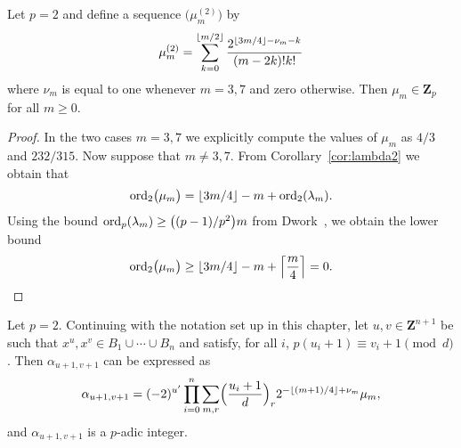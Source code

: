 \begin{lem} \label{lem:mu2}
Let $p = 2$ and define a sequence $\bigl(\mu_m^{(2)}\bigr)$ by 
\begin{equation*}
\mu_m^{(2)} = 
    \sum_{k=0}^{\left\lfloor m/2\right\rfloor} \frac{2^{\left\lfloor3m/4\right\rfloor - \nu_m - k}}{(m-2k)! k!}
\end{equation*}
where $\nu_m$ is equal to one whenever $m = 3, 7$ and zero otherwise. 
Then $\mu_m \in \mathbf{Z}_p$ for all $m \geq 0$.
\end{lem}

\begin{proof}
In the two cases $m = 3, 7$ we explicitly compute the values of 
$\mu_m$ as $4/3$ and $232/315$.  Now suppose that $m \neq 3, 7$. 
From Corollary~\ref{cor:lambda2} we obtain that 
\begin{equation*}
\operatorname{ord}_2 \bigl(\mu_m\bigr) 
    = \left\lfloor3m/4\right\rfloor - m + \operatorname{ord}_2(\lambda_m).
\end{equation*}
Using the bound $\operatorname{ord}_p(\lambda_m) \geq \bigl((p-1)/p^2\bigr) m$ from 
Dwork~\citep[Pages~55--57]{Dwork62}, we obtain the lower bound 
\begin{equation*}
\operatorname{ord}_2 \bigl(\mu_m\bigr) 
    \geq \left\lfloor3m/4\right\rfloor - m + \left\lceil\frac{m}{4}\right\rceil = 0. \qedhere
\end{equation*}
\end{proof}

\begin{thm} \label{thm:alpha2}
Let $p = 2$. 
Continuing with the notation set up in this chapter, let 
$u, v \in \mathbf{Z}^{n+1}$ be such that 
$x^u, x^v \in B_1 \cup \dotsb \cup B_n$ and satisfy, 
for all $i$, $p (u_i + 1) \equiv v_i + 1 \pmod{d}$. 
Then $\alpha_{u+1,v+1}$ can be expressed as 
\begin{equation} \label{eq:alpha2.0}
\alpha_{u+1,v+1} = (-2)^{u'} \prod_{i=0}^n \sum_{m,r} 
    \Bigl(\frac{u_i+1}{d}\Bigr)_r 2^{-\left\lfloor(m+1)/4\right\rfloor+\nu_m} \mu_m, 
\end{equation}
and $\alpha_{u+1,v+1}$ is a $p$-adic integer.
\end{thm}

